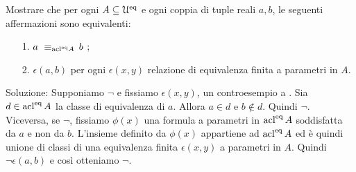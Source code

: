 \begin{exercise} Mostrare che per ogni $A\subseteq\EuScript U^{\rm eq}$ e ogni coppia di tuple reali $a,b$, le seguenti affermazioni sono equivalenti:
\begin{itemize}
\item[1.]  $a\ \equiv_{\acl^\eq\! A}\,b$ ;
\item[2.]  $\epsilon(a,b)$ per ogni $\epsilon(x,y)$ relazione di equivalenza finita a parametri in $A$.
\end{itemize} 
Soluzione:  Supponiamo $\neg$ e fissiamo $\epsilon(x,y)$, un controesempio a . Sia $d\in\mathop{\rm acl}^{\rm eq} A$ la classe di equivalenza di $a$. Allora $a\in d$ e $b\notin d$. Quindi  $\neg$. Viceversa, se $\neg$, fissiamo $\phi(x)$ una formula a parametri in $\mathop{\rm acl}^{\rm eq} A$ soddisfatta da $a$ e non da $b$. L'insieme definito da $\phi(x)$ appartiene ad $\mathop{\rm acl}^{\rm eq} A$ ed \`e quindi unione di classi di una equivalenza finita $\epsilon(x,y)$ a parametri in $A$. Quindi $\neg\epsilon(a,b)$ e cos\`i otteniamo $\neg$.
\QED
\end{exercise}

% 
% 

